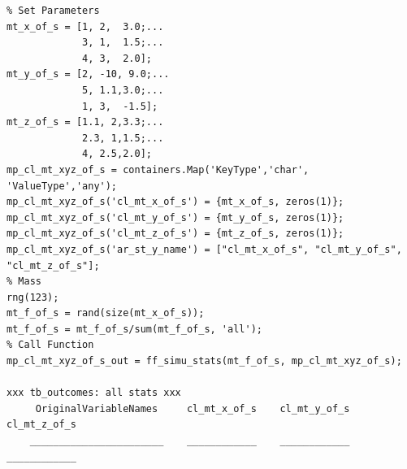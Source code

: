 \documentclass[
]{book}
\begin{document}
\begin{verbatim}
% Set Parameters
mt_x_of_s = [1, 2,  3.0;...
             3, 1,  1.5;...
             4, 3,  2.0];
mt_y_of_s = [2, -10, 9.0;...
             5, 1.1,3.0;...
             1, 3,  -1.5];
mt_z_of_s = [1.1, 2,3.3;...
             2.3, 1,1.5;...
             4, 2.5,2.0];
mp_cl_mt_xyz_of_s = containers.Map('KeyType','char', 'ValueType','any');
mp_cl_mt_xyz_of_s('cl_mt_x_of_s') = {mt_x_of_s, zeros(1)};
mp_cl_mt_xyz_of_s('cl_mt_y_of_s') = {mt_y_of_s, zeros(1)};
mp_cl_mt_xyz_of_s('cl_mt_z_of_s') = {mt_z_of_s, zeros(1)};
mp_cl_mt_xyz_of_s('ar_st_y_name') = ["cl_mt_x_of_s", "cl_mt_y_of_s", "cl_mt_z_of_s"];
% Mass
rng(123);
mt_f_of_s = rand(size(mt_x_of_s));
mt_f_of_s = mt_f_of_s/sum(mt_f_of_s, 'all');
% Call Function
mp_cl_mt_xyz_of_s_out = ff_simu_stats(mt_f_of_s, mp_cl_mt_xyz_of_s);

xxx tb_outcomes: all stats xxx
     OriginalVariableNames     cl_mt_x_of_s    cl_mt_y_of_s    cl_mt_z_of_s
    _______________________    ____________    ____________    ____________


\end{verbatim}
\end{document}
